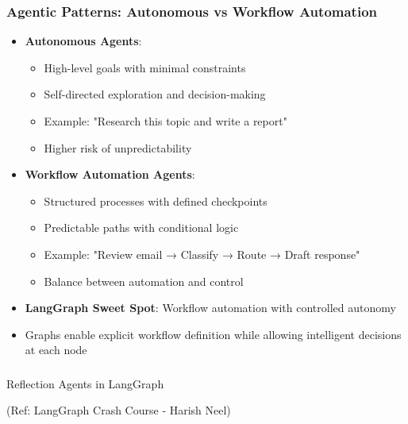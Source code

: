 \begin{frame}[fragile]\frametitle{Agentic Patterns: Autonomous vs Workflow Automation}
      \begin{itemize}
        \item \textbf{Autonomous Agents}:
        \begin{itemize}
            \item High-level goals with minimal constraints
            \item Self-directed exploration and decision-making
            \item Example: "Research this topic and write a report"
            \item Higher risk of unpredictability
        \end{itemize}
        \item \textbf{Workflow Automation Agents}:
        \begin{itemize}
            \item Structured processes with defined checkpoints
            \item Predictable paths with conditional logic
            \item Example: "Review email → Classify → Route → Draft response"
            \item Balance between automation and control
        \end{itemize}
        \item \textbf{LangGraph Sweet Spot}: Workflow automation with controlled autonomy
        \item Graphs enable explicit workflow definition while allowing intelligent decisions at each node
      \end{itemize}
\end{frame}
\begin{frame}[fragile]\frametitle{}
\begin{center}
{\Large Reflection Agents in LangGraph}

{\tiny (Ref: LangGraph Crash Course - Harish Neel)}

\end{center}
\end{frame}
